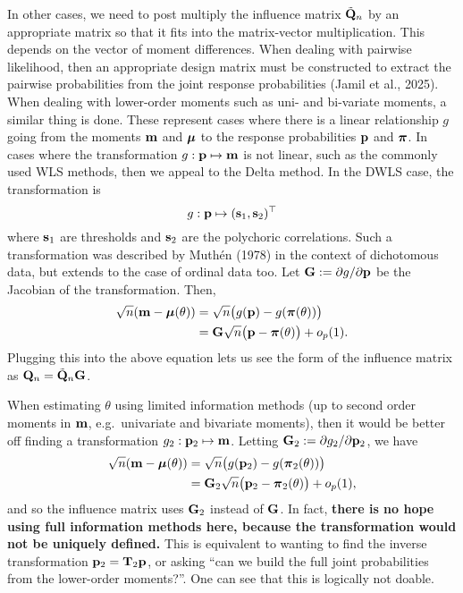 \documentclass[
  letterpaper,
  DIV=11,
  numbers=noendperiod]{scrartcl}
\begin{document}
In other cases, we need to post multiply the influence matrix
\(\tilde{{\mathbf Q}}_n\) by an appropriate matrix so that it fits into the
matrix-vector multiplication. This depends on the vector of moment
differences. When dealing with pairwise likelihood, then an appropriate
design matrix must be constructed to extract the pairwise probabilities
from the joint response probabilities (Jamil et al., 2025). When dealing
with lower-order moments such as uni- and bi-variate moments, a similar
thing is done. These represent cases where there is a linear
relationship \(g\) going from the moments \({\mathbf m}\) and \({\boldsymbol\mu}\) to the
response probabilities \({\mathbf p}\) and \({\boldsymbol\pi}\). In cases where the
transformation \(g: {\mathbf p} \mapsto {\mathbf m}\) is not linear, such as the
commonly used WLS methods, then we appeal to the Delta method. In the
DWLS case, the transformation is \[
g: {\mathbf p} \mapsto ({\mathbf s}_1, {\mathbf s}_2)^\top
\] where \({\mathbf s}_1\) are thresholds and \({\mathbf s}_2\) are the polychoric
correlations. Such a transformation was described by Muthén (1978) in
the context of dichotomous data, but extends to the case of ordinal data
too. Let \({\mathbf G} := \partial g / \partial {\mathbf p}\) be the Jacobian of the
transformation. Then, \[
\begin{aligned}
\sqrt n ({\mathbf m} - {\boldsymbol\mu}(\theta)) 
&= \sqrt n \big(g({\mathbf p}) - g({\boldsymbol\pi}(\theta))\big) \\
&= {\mathbf G} \sqrt n \big({\mathbf p} - {\boldsymbol\pi}(\theta)\big) + o_p(1).
\end{aligned}
\] Plugging this into the above equation lets us see the form of the
influence matrix as \({\mathbf Q}_n = \tilde{{\mathbf Q}}_n {\mathbf G}\).

When estimating \(\theta\) using limited information methods (up to
second order moments in \({\mathbf m}\), e.g.~univariate and bivariate
moments), then it would be better off finding a transformation
\(g_2: {\mathbf p}_2 \mapsto {\mathbf m}\). Letting
\({\mathbf G}_2 := \partial g_2 / \partial {\mathbf p}_2\), we have \[
\begin{aligned}
\sqrt n ({\mathbf m} - {\boldsymbol\mu}(\theta)) 
&= \sqrt n \big(g({\mathbf p}_2) - g({\boldsymbol\pi}_2(\theta))\big) \\
&= {\mathbf G}_2 \sqrt n \big({\mathbf p}_2 - {\boldsymbol\pi}_2(\theta)\big) + o_p(1),
\end{aligned}
\] and so the influence matrix uses \({\mathbf G}_2\) instead of \({\mathbf G}\). In
fact, \textbf{there is no hope using full information methods here,
because the transformation would not be uniquely defined.} This is
equivalent to wanting to find the inverse transformation
\({\mathbf p}_2 = {\mathbf T}_2 {\mathbf p}\), or asking ``can we build the full joint
probabilities from the lower-order moments?''. One can see that this is
logically not doable.
\end{document}
